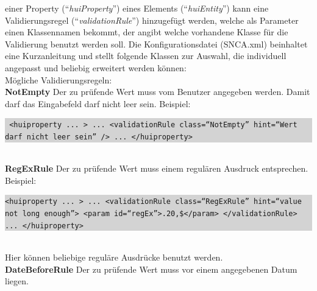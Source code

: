 \documentclass[a4paper,10pt]{book}
\begin{document}
einer Property (``\textit{huiProperty}'') eines Elements (``\textit{huiEntity}'')
kann eine Validierungsregel (``\textit{validationRule}'') hinzugefügt werden, welche als Parameter einen Klassennamen bekommt, der angibt welche vorhandene Klasse
für die Validierung benutzt werden soll. Die Konfigurationsdatei (SNCA.xml) beinhaltet eine Kurzanleitung
und stellt folgende Klassen zur Auswahl, die individuell angepasst und beliebig erweitert werden können:
\newline\\
Mögliche Validierungsregeln:
\newline\\
\textbf{NotEmpty}
\newline
Der zu prüfende Wert muss vom Benutzer angegeben werden. Damit darf das Eingabefeld darf nicht leer sein.
\newline
Beispiel:
\newline\\
\colorbox{lightgray}{\parbox{\textwidth}{
{\tt
<huiproperty ... > \newline
   ... \newline
   <validationRule class=``NotEmpty'' hint=``Wert darf nicht leer sein'' />\newline
   ...\newline
</huiproperty>
}
}}
\newline\\
\textbf{RegExRule}
\newline
Der zu prüfende Wert muss einem regulären Ausdruck entsprechen.
\newline
Beispiel:
\newline\\
\colorbox{lightgray}{\parbox{\textwidth}{
{\tt <huiproperty ... >\newline
   ...\newline
   <validationRule class=``RegExRule'' hint=``value not long enough''>\newline
      <param id=``regEx''>.{20,}\$</param>\newline
   </validationRule>\newline
   ...\newline
</huiproperty>}
}}
\newline\\
Hier können beliebige reguläre Ausdrücke benutzt werden.
\newline\\
\textbf{DateBeforeRule}
\newline
Der zu prüfende Wert muss vor einem angegebenen Datum liegen.
\end{document}
